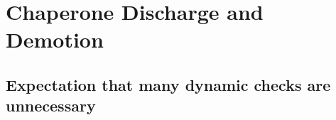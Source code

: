 \documentclass{sigplanconf}
\begin{document}





\section{Chaperone Discharge and Demotion}

\subsection{Expectation that many dynamic checks are unnecessary}
\end{document}
